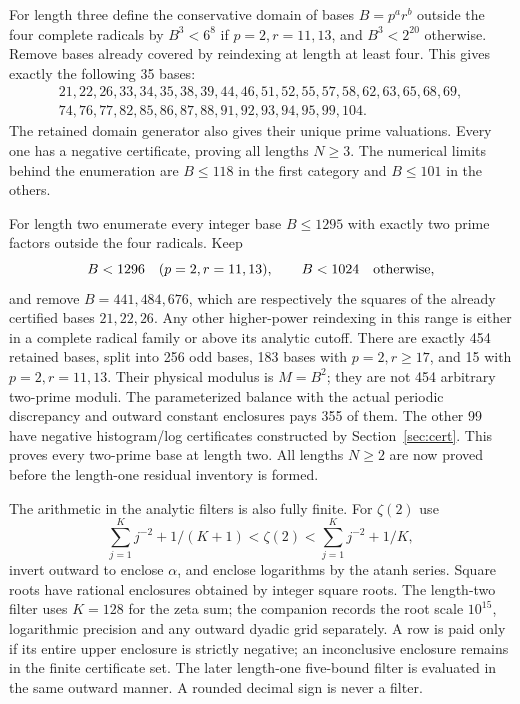 \documentclass[11pt]{article}
\theoremstyle{definition}\newtheorem{definition}[theorem]{Definition}
\theoremstyle{remark}\newtheorem{remark}[theorem]{Remark}
\begin{document}
For length three define the conservative domain of bases \(B=p^a r^b\)
outside the four complete radicals by
\(B^3<6^8\) if \(p=2,r=11,13\), and \(B^3<2^{20}\) otherwise.
Remove bases already covered by reindexing at length at least four.
This gives exactly the following 35 bases:
\[
 \begin{gathered}
 21,22,26,33,34,35,38,39,44,46,51,52,55,57,58,62,63,65,68,69,\\
 74,76,77,82,85,86,87,88,91,92,93,94,95,99,104 .
 \end{gathered}
\]
The retained domain generator also gives their unique prime valuations.
Every one has a negative certificate, proving all lengths \(N\ge3\).
The numerical limits behind the enumeration are \(B\le118\) in the
first category and \(B\le101\) in the others.

For length two enumerate every integer base \(B\le1295\) with exactly
two prime factors outside the four radicals. Keep
\[
 B<1296\quad(p=2,r=11,13),\qquad
 B<1024\quad\hbox{otherwise},
\]
and remove \(B=441,484,676\), which are respectively the squares of
the already certified bases \(21,22,26\). Any other higher-power
reindexing in this range is either in a complete radical family or
above its analytic cutoff.
There are exactly 454 retained bases, split into 256 odd bases,
183 bases with \(p=2,r\ge17\), and 15 with \(p=2,r=11,13\).
Their physical modulus is \(M=B^2\); they are not 454 arbitrary
two-prime moduli.
The parameterized balance with the actual periodic discrepancy and
outward constant enclosures pays 355 of them. The other 99 have
negative histogram/log certificates constructed by Section~\ref{sec:cert}.
This proves every two-prime base at length two.
All lengths \(N\ge2\) are now proved before the length-one residual
inventory is formed.

The arithmetic in the analytic filters is also fully finite.
For \(\zeta(2)\) use
\[
 \sum_{j=1}^{K}j^{-2}+1/(K+1)<\zeta(2)
            <\sum_{j=1}^{K}j^{-2}+1/K ,
\]
invert outward to enclose \(\alpha\), and enclose logarithms by the
atanh series. Square roots have rational enclosures obtained by integer
square roots. The length-two filter uses \(K=128\) for the zeta sum;
the companion records the root scale \(10^{15}\), logarithmic precision
and any outward dyadic grid separately. A row is paid only if its entire upper enclosure is
strictly negative; an inconclusive enclosure remains in the finite
certificate set. The later length-one five-bound filter is evaluated
in the same outward manner. A rounded decimal sign is never a filter.
\end{document}
